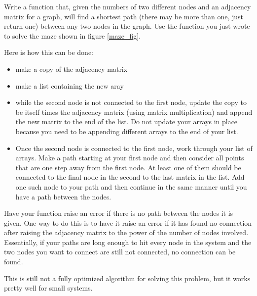 \begin{problem} \label{maze_prob}
Write a function that, given the numbers of two different nodes and an adjacency matrix for a graph, will find a shortest path (there may be more than one, just return one) between any two nodes in the graph.
Use the function you just wrote to solve the maze shown in figure \ref{maze_fig}.

Here is how this can be done:
\begin{itemize}
\item make a copy of the adjacency matrix
\item make a list containing the new aray
\item while the second node is not connected to the first node, update the copy to be itself times the adjacency matrix (using matrix multiplication) and append the new matrix to the end of the list.
Do not update your arrays in place because you need to be appending different arrays to the end of your list.
\item Once the second node is connected to the first node, work through your list of arrays. 
Make a path starting at your first node and then consider all points that are one step away from the first node.
At least one of them should be connected to the final node in the second to the last matrix in the list.
Add one such node to your path and then continue in the same manner until you have a path between the nodes.
\end{itemize}

Have your function raise an error if there is no path between the nodes it is given.
One way to do this is to have it raise an error if it has found no connection after raising the adjacency matrix to the power of the number of nodes involved.
Essentially, if your paths are long enough to hit every node in the system and the two nodes you want to connect are still not connected, no connection can be found.

This is still not a fully optimized algorithm for solving this problem, but it works pretty well for small systems.
\end{problem}

